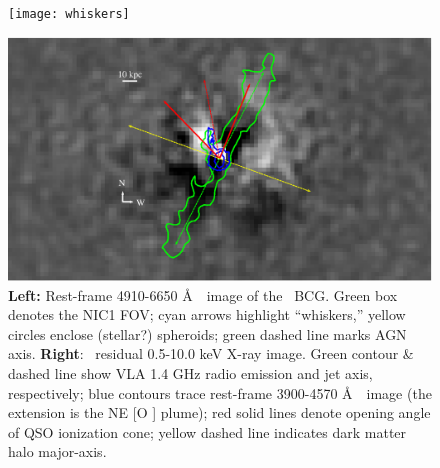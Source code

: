 \documentclass[11pt]{article}
\begin{document}
\begin{figure}[htp]
  \begin{center}
    \begin{minipage}{0.48\linewidth}	
      \texttt{[image: whiskers]}
    \end{minipage}
    \begin{minipage}{0.47\linewidth}
      \includegraphics*[width=\textwidth, trim=47mm 7mm 49mm 5mm, clip]{xray_sub_cones}
    \end{minipage}
    \caption{{\bf{Left:}} Rest-frame 4910-6650 \AA\ \hst\ image of the
      \irs\ BCG. Green box denotes the NIC1 FOV; cyan arrows highlight
      ``whiskers,'' yellow circles enclose (stellar?) spheroids; green
      dashed line marks AGN axis. {\bf{Right}}: \chandra\ residual
      0.5-10.0 keV X-ray image. Green contour \& dashed line show VLA
      1.4 GHz radio emission and jet axis, respectively; blue contours
      trace rest-frame 3900-4570 \AA\ \hst\ image (the extension is
      the NE [O ] plume); red solid lines denote opening
      angle of QSO ionization cone; yellow dashed line indicates dark
      matter halo major-axis.}
    \label{fig:i09}
 \end{center}
\end{figure}

\end{document}
